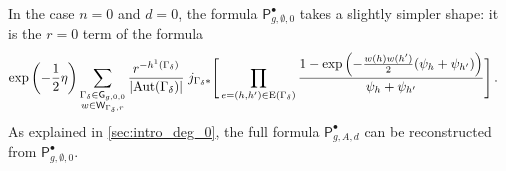 \documentclass[a4paper,12pt]{article} %
\newcommand{\bb}[1]{{\mathbb{#1}}}
\def\P{\mathsf{P}}
\def\Aut{{\rm Aut}}
\def\E{\mathrm{E}}
\def\V{\mathrm{V}}
\def\G{\mathsf{G}}
\theoremstyle{definition}
\theoremstyle{plain}%
\newtheorem{proposition}[definition]{Proposition}
\newcommand{\Picabs}{\mathfrak{Pic}}
\begin{document}
In the case $n=0$ and $d=0$, the formula $\P_{g,\emptyset,0}^{\bullet}$ takes a slightly simpler shape: it is the $r=0$ term of the formula
\begin{align} \label{eqn:P_gformula2}
\exp\left(-\frac12 \eta \right) \sum_{
\substack{\Gamma_\delta\in \G_{g,0,0} \\
w\in \mathsf{W}_{\Gamma_\delta,r}}
}
\frac{r^{-h^1(\Gamma_\delta)}}{|\Aut(\Gamma_\delta)| }
\;
j_{\Gamma_\delta*}\Bigg[&
\prod_{e=(h,h')\in \E(\Gamma_\delta)}
\frac{1-\exp\left(-\frac{w(h)w(h')}2(\psi_h+\psi_{h'})\right)}{\psi_h + \psi_{h'}} \Bigg]\, . %
\end{align}
As explained in \cref{sec:intro_deg_0}, the full formula $\P_{g,A,d}^{\bullet}$ can be reconstructed from $\P_{g,\emptyset,0}^\bullet$.
\end{document}
